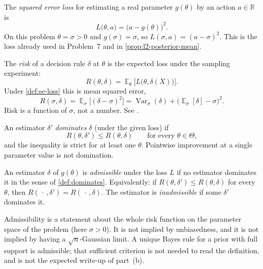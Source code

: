 \documentclass[11pt,a4paper]{article}
\DeclareMathOperator{\Var}{Var}
\DeclareMathOperator{\E}{\mathbb{E}}
\begin{document}
\begin{definition}
\label{def:se-loss}
The \emph{squared error loss} for estimating a real parameter \( g(\theta) \) by an action \( a\in\mathbb{R} \) is
\[
L\bigl(\theta,a\bigr)
=
\bigl(a-g(\theta)\bigr)^{2}.
\]
On this problem \( \theta=\sigma>0 \) and \( g(\sigma)=\sigma \), so \( L(\sigma,a)=(a-\sigma)^{2} \). This is the loss already used in Problem~7 and in \cref{prop:l2-posterior-mean}.
\end{definition}

\begin{definition}[Risk]
\label{def:risk}
The \emph{risk} of a decision rule \( \delta \) at \( \theta \) is the expected loss under the sampling experiment:
\[
R(\theta,\delta)
=
\E_\theta\bigl[L\bigl(\theta,\delta(X)\bigr)\bigr].
\]
Under \cref{def:se-loss} this is mean squared error,
\[
R(\sigma,\delta)
=
\E_\sigma\bigl[(\delta-\sigma)^{2}\bigr]
=
\Var_\sigma(\delta)
+
\bigl(\E_\sigma[\delta]-\sigma\bigr)^{2}.
\]
Risk is a function of \( \sigma \), not a number. See \citep[\S7.1]{hogg2019}.
\end{definition}

\begin{definition}[Domination]
\label{def:dominates}
An estimator \( \delta' \) \emph{dominates} \( \delta \) (under the given loss) if
\[
R(\theta,\delta')
\le
R(\theta,\delta)
\qquad\text{for every }\theta\in\Theta,
\]
and the inequality is strict for at least one \( \theta \). Pointwise improvement at a single parameter value is not domination.
\end{definition}

\begin{definition}
\label{def:admissible}
An estimator \( \delta \) of \( g(\theta) \) is \emph{admissible} under the loss \( L \) if no estimator dominates it in the sense of \cref{def:dominates}. Equivalently: if \( R(\theta,\delta')\le R(\theta,\delta) \) for every \( \theta \), then \( R(\,\cdot\,,\delta')=R(\,\cdot\,,\delta) \). The estimator is \emph{inadmissible} if some \( \delta' \) dominates it.

Admissibility is a statement about the whole risk function on the parameter space of the problem (here \( \sigma>0 \)). It is not implied by unbiasedness, and it is not implied by having a \( \sqrt{n} \)-Gaussian limit. A unique Bayes rule for a prior with full support is admissible; that sufficient criterion is not needed to read the definition, and is not the expected write-up of part~(b).
\end{definition}
\end{document}
